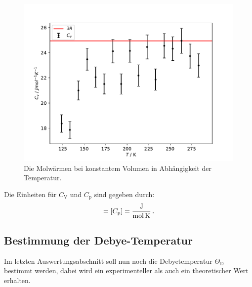 \begin{figure}[h]
	\centering
	\includegraphics[scale=0.9]{fig/plot3.pdf}
	\caption{Die Molwärmen bei konstantem Volumen in Abhängigkeit der Temperatur.}
	\label{fig:cv1}
\end{figure}
\FloatBarrier
\noindent Die Einheiten für $C_\mathrm{V}$ und $C_\mathrm{p}$ sind gegeben durch:
\begin{equation*}
	[C_\mathrm{V}] = [C_\mathrm{p}] = \si{\joule\per\mole\per\kelvin}\,\text.
\end{equation*}

\subsection{Bestimmung der Debye-Temperatur}
Im letzten Auswertungsabschnitt soll nun noch die Debyetemperatur $\Theta_\mathrm{D}$ bestimmt werden, dabei wird ein experimenteller als auch ein theoretischer Wert erhalten.
